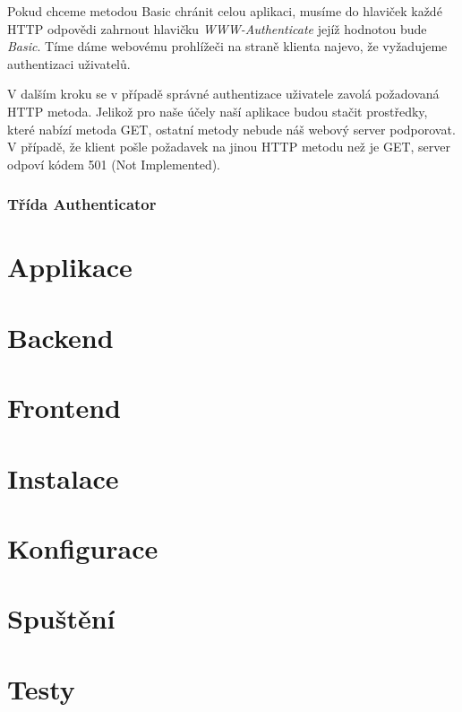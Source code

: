     Pokud chceme metodou Basic chránit celou aplikaci, musíme do hlaviček každé HTTP odpovědi zahrnout hlavičku \emph{WWW-Authenticate} jejíž hodnotou bude \emph{Basic}. Tíme dáme webovému prohlížeči na straně klienta najevo, že vyžadujeme authentizaci uživatelů.
    
    V dalším kroku se v případě správné authentizace uživatele zavolá požadovaná HTTP metoda. Jelikož pro naše účely naší aplikace budou stačit prostředky, které nabízí metoda GET, ostatní metody nebude náš webový server podporovat. V případě, že klient pošle požadavek na jinou HTTP metodu než je GET, server odpoví kódem 501 (Not Implemented).
    
    
    \subsubsection{Třída Authenticator}
    
\section{Applikace}
\section{Backend}
\section{Frontend} 
\section{Instalace}
\section{Konfigurace}
\section{Spuštění}
\section{Testy}